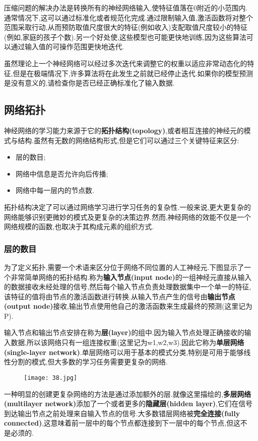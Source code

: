 \documentclass[11pt,a4paper,oneside]{book}
\begin{document}
压缩问题的解决办法是转换所有的神经网络输入,使特征值落在0附近的小范围内.通常情况下,这可以通过标准化或者规范化完成.通过限制输入值,激活函数将对整个范围采取行动,从而预防取值尺度很大的特征(例如收入)支配取值尺度较小的特征(例如,家庭的孩子个数).另一个好处使,这些模型也可能更快地训练,因为这些算法可以通过输入值的可操作范围更快地迭代.

\begin{tcolorbox}[colback=pink!10!white,colframe=pink!100!black]
虽然理论上一个神经网络可以经过多次迭代来调整它的权重以适应非常动态化的特征,但是在极端情况下,许多算法将在此发生之前就已经停止迭代.如果你的模型预测是没有意义的,请检查你是否已经正确标准化了输入数据.
\end{tcolorbox}

\subsection{网络拓扑}
神经网络的学习能力来源于它的\textbf{拓扑结构(topology)},或者相互连接的神经元的模式与结构.虽然有无数的网络结构形式,但是它们可以通过三个关键特征来区分:
\begin{itemize}
	\item 层的数目;
	\item 网络中信息是否允许向后传播;
	\item 网络中每一层内的节点数.
\end{itemize}
拓扑结构决定了可以通过网络学习进行学习任务的复杂性.一般来说,更大更复杂的网络能够识别更微妙的模式及更复杂的决策边界.然而,神经网络的效能不仅是一个网络规模的函数,也取决于其构成元素的组织方式.

\subsubsection{层的数目}
为了定义拓扑,需要一个术语来区分位于网络不同位置的人工神经元.下图显示了一个非常简单网络的拓扑结构.称为\textbf{输入节点(input node)}的一组神经元直接从输入的数据接收未经处理的信号,然后每个输入节点负责处理数据集中一个单一的特征,该特征的值将由节点的激活函数进行转换.从输入节点产生的信号由\textbf{输出节点(output node)}接收,输出节点使用他自己的激活函数来生成最终的预测(这里记为P).

输入节点和输出节点安排在称为\textbf{层(layer)}的组中.因为输入节点处理正确接收的输入数据,所以该网络只有一组连接权重(这里记为w1,w2,w3).因此它称为\textbf{单层网络(single-layer network)}.单层网络可以用于基本的模式分类,特别是可用于能够线性分割的模式,但大多数的学习任务需要更复杂的网络.

\begin{figure}[H]
	\centering
	\texttt{[image: 38.jpg]}
\end{figure}
一种明显的创建更复杂网络的方法是通过添加额外的层.就像这里描绘的,\textbf{多层网络(multilayer network)}添加了一个或者更多的\textbf{隐藏层(hidden layer)},它们在信号到达输出节点之前处理来自输入节点的信号.大多数错层网络被\textbf{完全连接(fully connected)},这意味着前一层中的每个节点都连接到下一层中的每个节点,但这不是必须的.
\end{document}
